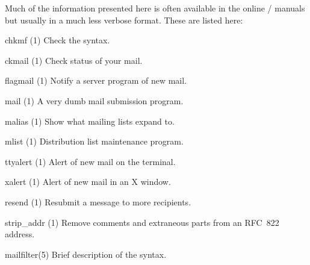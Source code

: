 Much of the information presented here is often available in the
online \unix/ manuals but usually in a much less verbose format.
These are listed here:
\begin{describe}
\item[\man chkmf (1)]	Check the  syntax.
\item[\man ckmail (1)]	Check status of your mail.
\item[\man flagmail (1)]	Notify a server program of new mail.
\item[\man mail (1)]	A very dumb mail submission program.
\item[\man malias (1)]	Show what mailing lists expand to.
\item[\man mlist (1)]	Distribution list maintenance program.
\item[\man ttyalert (1)]	Alert of new mail on the terminal.
\item[\man xalert (1)]	Alert of new mail in an X window.
\item[\man resend (1)]	Resubmit a message to more recipients.
\item[\man strip\_addr (1)] Remove comments and extraneous parts from an
RFC~822 \linebreak[3]address.

\item[\man mailfilter(5)] Brief description of the
			 syntax.
\end{describe}
